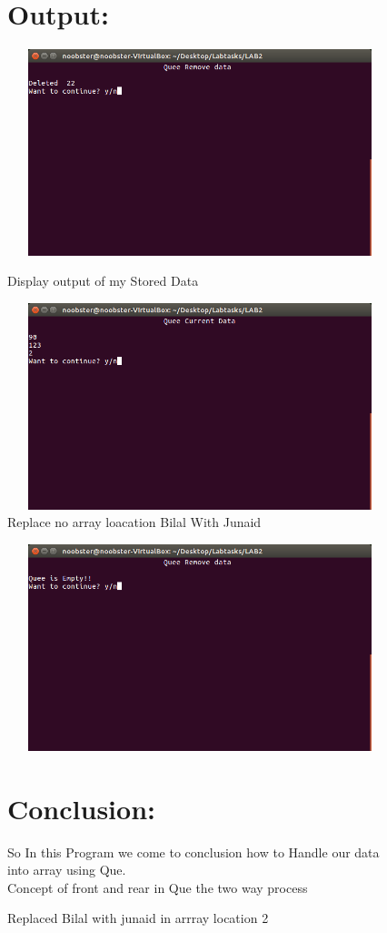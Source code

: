 \documentclass[11pt]{article}            %
\begin{document}
\begin{figure}
\section{Output: }
\centering
  \includegraphics[width=12cm,height=6cm,keepaspectratio]{3.png}
\caption{Display output of my Stored Data}
\label{Figure:3}   
 \includegraphics[width=12cm,height=6cm,keepaspectratio]{4.png}
\caption{Replace no array loacation Bilal With Junaid}
\label{Figure:4}
\end{figure}
\begin{figure}
 \includegraphics[width=12cm,height=6cm,keepaspectratio]{5.png}
\caption{Replaced Bilal with junaid in arrray location 2}
\label{Figure:5}
\section{Conclusion:}  
So In this Program we come to conclusion how to Handle our data into array using Que.  \\
Concept of front and rear in Que the two way process  \\
\end{figure}
\end{document}
